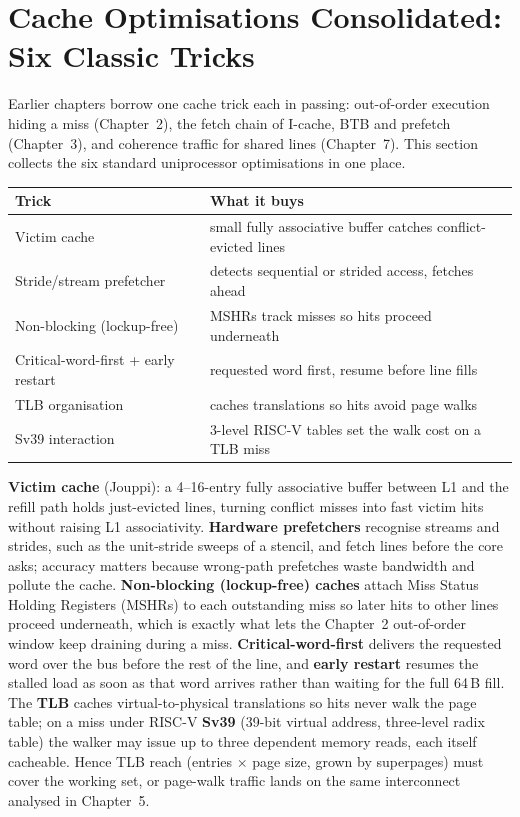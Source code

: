 \section{Cache Optimisations Consolidated: Six Classic Tricks}\label{sec:cache-opts}
Earlier chapters borrow one cache trick each in passing: out-of-order execution hiding a miss (Chapter~2), the fetch chain of I-cache, BTB and prefetch (Chapter~3), and coherence traffic for shared lines (Chapter~7). This section collects the six standard uniprocessor optimisations in one place.
\begin{center}
\begin{tabular}{lp{8.2cm}}
\toprule Trick & What it buys \\ \midrule
Victim cache & small fully associative buffer catches conflict-evicted lines \\
Stride/stream prefetcher & detects sequential or strided access, fetches ahead \\
Non-blocking (lockup-free) & MSHRs track misses so hits proceed underneath \\
Critical-word-first + early restart & requested word first, resume before line fills \\
TLB organisation & caches translations so hits avoid page walks \\
Sv39 interaction & 3-level RISC-V tables set the walk cost on a TLB miss \\ \bottomrule
\end{tabular}
\end{center}
\textbf{Victim cache} (Jouppi): a 4--16-entry fully associative buffer between L1 and the refill path holds just-evicted lines, turning conflict misses into fast victim hits without raising L1 associativity. \textbf{Hardware prefetchers} recognise streams and strides, such as the unit-stride sweeps of a stencil, and fetch lines before the core asks; accuracy matters because wrong-path prefetches waste bandwidth and pollute the cache. \textbf{Non-blocking (lockup-free) caches} attach Miss Status Holding Registers (MSHRs) to each outstanding miss so later hits to other lines proceed underneath, which is exactly what lets the Chapter~2 out-of-order window keep draining during a miss. \textbf{Critical-word-first} delivers the requested word over the bus before the rest of the line, and \textbf{early restart} resumes the stalled load as soon as that word arrives rather than waiting for the full 64\,B fill. The \textbf{TLB} caches virtual-to-physical translations so hits never walk the page table; on a miss under RISC-V \textbf{Sv39} (39-bit virtual address, three-level radix table) the walker may issue up to three dependent memory reads, each itself cacheable. Hence TLB reach (entries $\times$ page size, grown by superpages) must cover the working set, or page-walk traffic lands on the same interconnect analysed in Chapter~5.

